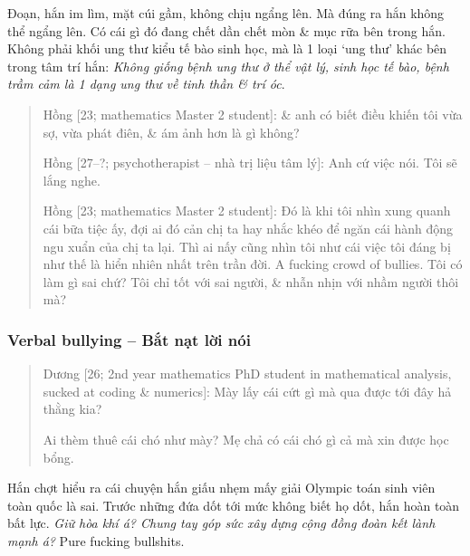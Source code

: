 \documentclass[12pt]{article}
\begin{document}
Đoạn, hắn im lìm, mặt cúi gầm, không chịu ngẩng lên. Mà đúng ra hắn không thể ngẩng lên. Có cái gì đó đang chết dần chết mòn \& mục rữa bên trong hắn. Không phải khối ung thư kiểu tế bào sinh học, mà là 1 loại `ung thư' khác bên trong tâm trí hắn: {\it Không giống bệnh ung thư ở thể vật lý, sinh học tế bào, bệnh trầm cảm là 1 dạng ung thư về tinh thần \& trí óc}.
\begin{quotation}
	{\sf Hồng [23; mathematics Master 2 student]}: \& anh có biết điều khiến tôi vừa sợ, vừa phát điên, \& ám ảnh hơn là gì không?
	
	{\sf Hồng [27--?; psychotherapist -- nhà trị liệu tâm lý]}: Anh cứ việc nói. Tôi sẽ lắng nghe.
	
	{\sf Hồng [23; mathematics Master 2 student]}: Đó là khi tôi nhìn xung quanh cái bữa tiệc ấy, đợi ai đó cản chị ta hay nhắc khéo để ngăn cái hành động ngu xuẩn của chị ta lại. Thì ai nấy cũng nhìn tôi như cái việc tôi đáng bị như thế là hiển nhiên nhất trên trần đời. A fucking crowd of bullies. Tôi có làm gì sai chứ? Tôi chỉ tốt với sai người, \& nhẫn nhịn với nhầm người thôi mà?
\end{quotation}

\subsubsection{Verbal bullying -- Bắt nạt lời nói}

\begin{quotation}
	{\sf Dương [26; 2nd year mathematics PhD student in mathematical analysis, sucked at coding \& numerics]}: Mày lấy cái cứt gì mà qua được tới đây hả thằng kia?
	
	Ai thèm thuê cái chó như mày? Mẹ chả có cái chó gì cả mà xin được học bổng.
\end{quotation}
Hắn chợt hiểu ra cái chuyện hắn giấu nhẹm mấy giải Olympic toán sinh viên toàn quốc là sai. Trước những đứa dốt tới mức không biết họ dốt, hắn hoàn toàn bất lực. {\it Giữ hòa khí á? Chung tay góp sức xây dựng cộng đồng đoàn kết lành mạnh á?} Pure fucking bullshits.
\end{document}

